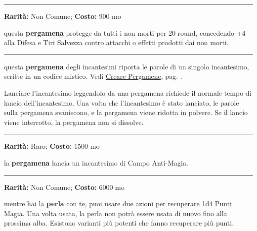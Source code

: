 \begin{multicols}{2}
\smallskip\noindent\rule{\linewidth}{2pt}  \hypertarget{Pergamenacontroinonmorti}{}\smallskip{}\noindent\label{Pergamenacontroinonmorti}

\textbf{Rarità:} Non Comune; \textbf{Costo:} 900 mo

questa \textbf{pergamena} protegge da tutti i non morti per 20 round, concedendo +4 alla Difesa e Tiri Salvezza contro attacchi o effetti prodotti dai non morti.

\smallskip\noindent\rule{\linewidth}{2pt}  \hypertarget{PergamenadegliIncantesimi}{}\smallskip{}\noindent\label{PergamenadegliIncantesimi}

questa \textbf{pergamena} degli incantesimi riporta le parole di un singolo incantesimo, scritte in un codice mistico. Vedi \hyperlink{crearepergamene}{Creare Pergamene}, pag. \pageref{crearepergamene}.

Lanciare l'incantesimo leggendolo da una pergamena richiede il normale tempo di lancio dell'incantesimo. Una volta che l'incantesimo è stato lanciato, le parole sulla pergamena svaniscono, e la pergamena viene ridotta in polvere. Se il lancio viene interrotto, la pergamena non si dissolve.

\smallskip\noindent\rule{\linewidth}{2pt}  \hypertarget{Pergamenaprotettivacontrolamagia}{}\smallskip{}\noindent\label{Pergamenaprotettivacontrolamagia}

\textbf{Rarità:} Raro; \textbf{Costo:} 1500 mo

la \textbf{pergamena} lancia un incantesimo di Campo Anti-Magia.

\smallskip\noindent\rule{\linewidth}{2pt}  \hypertarget{PerladelPotere}{}\smallskip{}\noindent\label{PerladelPotere}

\textbf{Rarità:} Non Comune; \textbf{Costo:} 6000 mo

mentre hai la \textbf{perla} con te, puoi usare due azioni per recuperare 1d4 Punti Magia. Una volta usata, la perla non potrà essere usata di nuovo fino alla prossima alba. Esistono varianti più potenti che fanno recuperare più punti.


\end{multicols}
